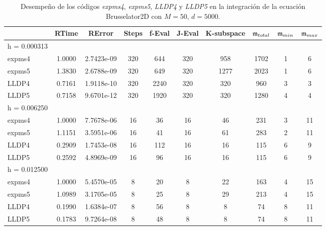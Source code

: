 \begin{table}[h]
	\caption{Desempeño de los códigos \emph{expms4}, \emph{expms5}, \emph{LLDP4} y \emph{LLDP5} en la integración de la ecuación Brusselator2D con $M=50$, $d=5000$.}
	\centering
	\begin{tabular}{lccccccccc}
		\hline
		& RTime & RError & Steps & f-Eval & J-Eval & K-subspace & $\mathfrak{m}_{total}$ & $\mathfrak{m}_{min}$ & $\mathfrak{m}_{max}$ \\
		\hline
		h = 0.000313 &  &  &  &  &  &  &  &  &  \\
		expms4 & 1.0000 & 2.7423e-09 & 320 & 644 & 320 & 958 & 1702 & 1 & 6  \\
		expms5 & 1.3830 & 2.6788e-09 & 320 & 649 & 320 & 1277 & 2023 & 1 & 6  \\
		LLDP4 & 0.7161 & 1.9118e-10 & 320 & 2240 & 320 & 320 & 960 & 3 & 3  \\
		LLDP5 & 0.7158 & 9.6701e-12 & 320 & 1920 & 320 & 320 & 1280 & 4 & 4  \\
		\hline
		h = 0.006250 &  &  &  &  &  &  &  &  &  \\
		expms4 & 1.0000 & 7.7678e-06 & 16 & 36 & 16 & 46 & 231 & 3 & 11  \\
		expms5 & 1.1151 & 3.5951e-06 & 16 & 41 & 16 & 61 & 283 & 2 & 11  \\
		LLDP4 & 0.2909 & 1.7453e-08 & 16 & 112 & 16 & 16 & 115 & 6 & 9  \\
		LLDP5 & 0.2592 & 4.8969e-09 & 16 & 96 & 16 & 16 & 115 & 6 & 9  \\
		\hline
		h = 0.012500 &  &  &  &  &  &  &  &  &  \\
		expms4 & 1.0000 & 5.4570e-05 & 8 & 20 & 8 & 22 & 163 & 4 & 15  \\
		expms5 & 1.0989 & 3.1705e-05 & 8 & 25 & 8 & 29 & 213 & 4 & 15  \\
		LLDP4 & 0.1990 & 1.6384e-07 & 8 & 56 & 8 & 8 & 74 & 8 & 11  \\
		LLDP5 & 0.1783 & 9.7264e-08 & 8 & 48 & 8 & 8 & 74 & 8 & 11  \\
		\hline
	\end{tabular}
	\label{tab:num-exp-lldp-fix-step:br2dna}
\end{table}

